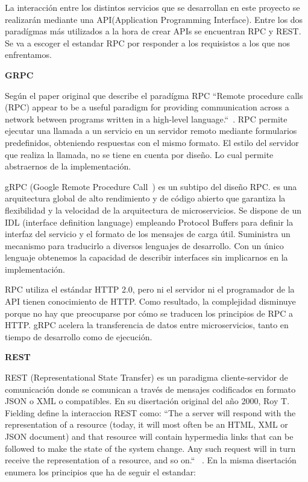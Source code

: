 La interacción entre los distintos servicios que se desarrollan en este proyecto se realizarán mediante una \gls{API}(Application Programming Interface). Entre los dos paradígmas más utilizados a la hora de crear APIs se encuentran RPC y REST. Se va a escoger el estandar RPC por responder a los requisistos a los que nos enfrentamos.

\textbf{GRPC}

Según el paper original que describe el paradígma RPC “Remote procedure calls (RPC) appear to be a useful paradigm for providing communication across a
network between programs written in a high-level language.“~\cite{Birrell198439}. RPC permite ejecutar una llamada a un servicio en un servidor remoto mediante formularios predefinidos, obteniendo respuestas con el mismo formato. El estilo del servidor que realiza la llamada, no se tiene en cuenta por diseño. Lo cual permite abstraernos de la implementación.

gRPC (Google Remote Procedure Call~\cite{grpc}) es un subtipo del diseño RPC.  es una arquitectura global de alto rendimiento y de código abierto que garantiza la flexibilidad y la velocidad de la arquitectura de microservicios. Se dispone de un \gls{IDL} (interface definition language) empleando Protocol Buffers para definir la interfaz del servicio y el formato de los mensajes de carga útil. Suministra un mecanismo para traducirlo a diversos lenguajes de desarrollo. Con un único lenguaje obtenemos la capacidad de describir interfaces sin implicarnos en la implementación.

RPC utiliza el estándar HTTP 2.0, pero ni el servidor ni el programador de la API tienen conocimiento de HTTP. Como resultado, la complejidad disminuye porque no hay que preocuparse por cómo se traducen los principios de RPC a HTTP. gRPC acelera la transferencia de datos entre microservicios, tanto en tiempo de desarrollo como de ejecución.

\textbf{REST}

\gls{REST} (Representational State Transfer) es un paradigma cliente-servidor de comunicación donde se comunican a través de mensajes codificados en formato JSON o XML o compatibles. En su disertación original del año 2000, Roy T. Fielding define la interaccion REST como: “The a server will respond with the representation of a resource (today, it will most often be an HTML, XML or JSON document) and that resource will contain hypermedia links that can be followed to make the state of the system change. Any such request will in turn receive the representation of a resource, and so on.“ ~\cite{FieldingRoyThomas2000Asat}. En la misma disertación enumera los principios que ha de seguir el estandar:

